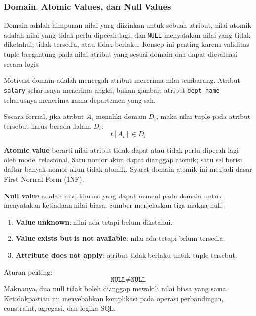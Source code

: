 \subsubsection{Domain, Atomic Values, dan Null Values}

\begin{jawab}
Domain adalah himpunan nilai yang diizinkan untuk sebuah atribut, nilai atomik adalah nilai yang tidak perlu dipecah lagi, dan \texttt{NULL} menyatakan nilai yang tidak diketahui, tidak tersedia, atau tidak berlaku. Konsep ini penting karena validitas tuple bergantung pada nilai atribut yang sesuai domain dan dapat dievaluasi secara logis.
\end{jawab}

Motivasi domain adalah mencegah atribut menerima nilai sembarang. Atribut \texttt{salary} seharusnya menerima angka, bukan gambar; atribut \texttt{dept\_name} seharusnya menerima nama departemen yang sah.

Secara formal, jika atribut \(A_i\) memiliki domain \(D_i\), maka nilai tuple pada atribut tersebut harus berada dalam \(D_i\):
\begin{equation}
    t[A_i] \in D_i
    \label{eq:domain-relational}
\end{equation}

\textbf{Atomic value} berarti nilai atribut tidak dapat atau tidak perlu dipecah lagi oleh model relasional. Satu nomor akun dapat dianggap atomik; satu sel berisi daftar banyak nomor akun tidak atomik. Syarat domain atomik ini menjadi dasar First Normal Form (1NF).

\textbf{Null value} adalah nilai khusus yang dapat muncul pada domain untuk menyatakan ketiadaan nilai biasa. Sumber menjelaskan tiga makna null:
\begin{enumerate}
    \item \textbf{Value unknown}: nilai ada tetapi belum diketahui.
    \item \textbf{Value exists but is not available}: nilai ada tetapi belum tersedia.
    \item \textbf{Attribute does not apply}: atribut tidak berlaku untuk tuple tersebut.
\end{enumerate}

Aturan penting:
\begin{equation}
    \texttt{NULL} \neq \texttt{NULL}
    \label{eq:null-not-equal}
\end{equation}
Maknanya, dua null tidak boleh dianggap mewakili nilai biasa yang sama. Ketidakpastian ini menyebabkan komplikasi pada operasi perbandingan, constraint, agregasi, dan logika SQL.

